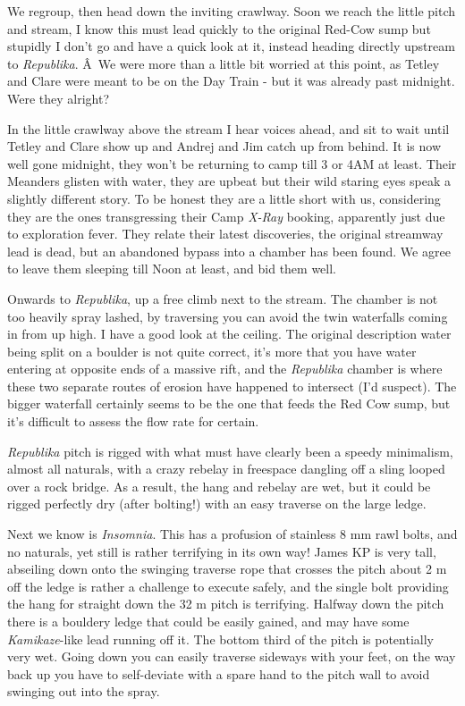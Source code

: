 We regroup, then head down the inviting crawlway. Soon we reach the
little pitch and stream, I know this must lead quickly to the original
Red-Cow sump but stupidly I don't go and have a quick look at it,
instead heading directly upstream to \emph{Republika}. Â~We were more
than a little bit worried at this point, as Tetley and Clare were meant
to be on the Day Train - but it was already past midnight. Were they
alright?

In the little crawlway above the stream I hear voices ahead, and sit to
wait until Tetley and Clare show up and Andrej and Jim catch up from
behind. It is now well gone midnight, they won't be returning to camp
till 3 or 4AM at least. Their Meanders glisten with water, they are
upbeat but their wild staring eyes speak a slightly different story. To
be honest they are a little short with us, considering they are the ones
transgressing their Camp \emph{X-Ray} booking, apparently just due to
exploration fever. They relate their latest discoveries, the original
streamway lead is dead, but an abandoned bypass into a chamber has been
found. We agree to leave them sleeping till Noon at least, and bid them
well.

Onwards to \emph{Republika}, up a free climb next to the stream. The
chamber is not too heavily spray lashed, by traversing you can avoid the
twin waterfalls coming in from up high. I have a good look at the
ceiling. The original description water being split on a boulder is not
quite correct, it's more that you have water entering at opposite ends
of a massive rift, and the \emph{Republika} chamber is where these two
separate routes of erosion have happened to intersect (I'd suspect). The
bigger waterfall certainly seems to be the one that feeds the Red Cow
sump, but it's difficult to assess the flow rate for certain.

\emph{Republika} pitch is rigged with what must have clearly been a
speedy minimalism, almost all naturals, with a crazy rebelay in
freespace dangling off a sling looped over a rock bridge. As a result,
the hang and rebelay are wet, but it could be rigged perfectly dry
(after bolting!) with an easy traverse on the large ledge.

Next we know is \emph{Insomnia}. This has a profusion of stainless 8 mm
rawl bolts, and no naturals, yet still is rather terrifying in its own
way! James KP is very tall, abseiling down onto the swinging traverse
rope that crosses the pitch about 2 m off the ledge is rather a
challenge to execute safely, and the single bolt providing the hang for
straight down the 32 m pitch is terrifying. Halfway down the pitch there
is a bouldery ledge that could be easily gained, and may have some
\emph{Kamikaze}-like lead running off it. The bottom third of the pitch
is potentially very wet. Going down you can easily traverse sideways
with your feet, on the way back up you have to self-deviate with a spare
hand to the pitch wall to avoid swinging out into the spray.

